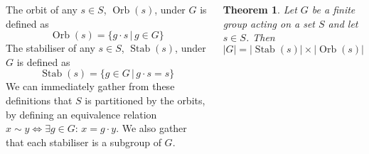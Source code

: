 \documentclass{tikzposter} %
\DeclareMathOperator{\Orb}{Orb}
\DeclareMathOperator{\Stab}{Stab}
\newtheorem{theorem}{Theorem}
\begin{document}
\begin{columns}
{  The orbit of any $s \in S$, $\Orb(s)$, under $G$ is defined as
  \[
    \Orb(s) = \{g \cdot s \,|\, g \in G\}
  \]
  The stabiliser of any $s \in S$, $\Stab(s)$, under $G$ is defined as
  \[
    \Stab(s) = \{g \in G\,|\, g \cdot s = s\}
  \]
  We can immediately gather from these definitions that $S$ is partitioned by the orbits, by defining an equivalence relation $x \sim y \Leftrightarrow \exists g \in G:\,x = g\cdot y$. We also gather that each stabiliser is a subgroup of $G$. \\

  \begin{theorem}
    Let $G$ be a finite group acting on a set $S$ and let $s \in S$. Then
    \[
      |G| = |\Stab(s)| \times |\Orb(s)|
    \]
  \end{theorem}
}
\end{columns}
\end{document}
